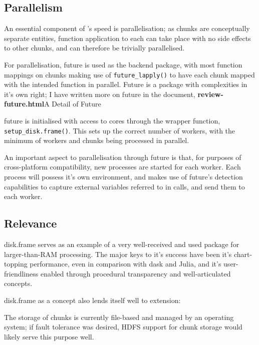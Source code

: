\hypertarget{sec:parallelisation}{
    \subsection{Parallelism}\label{sec:parallelisation}}

An essential component of 's speed is parallelisation; as
chunks are conceptually separate entities, function application to each
can take place with no side effects to other chunks, and can therefore
be trivially parallelised.

For parallelisation, future is used as the backend package, with most
function mappings on chunks making use of \texttt{future_lapply()}
to have each chunk mapped with the intended function in parallel. Future
is a package with complexities in it's own right; I have written more on
future in the document, \textbf{review-future.html}{A Detail of Future}

future is initialised with access to cores through the wrapper function,
\texttt{setup_disk.frame()}\cite{zj19:_key}.
This sets up the correct number of workers, with the minimum of workers
and chunks being processed in parallel.

An important aspect to parallelisation through future is that, for
purposes of cross-platform compatibility, new \R processes are started
for each worker\cite{zj19:_using}. Each process will possess it's own
environment, and  makes use of future's detection capabilities
to capture external variables referred to in calls, and send them to
each worker.

\hypertarget{sec:relevance}{%
    \subsection{Relevance}\label{sec:relevance}}

disk.frame serves as an example of a very well-received and used package
for larger-than-RAM processing. The major keys to it's success have been
it's chart-topping performance, even in comparison with dask and Julia,
and it's user-friendliness enabled through procedural transparency and
well-articulated concepts.

disk.frame as a concept also lends itself well to extension:

The storage of chunks is currently file-based and managed by an
operating system; if fault tolerance was desired, HDFS support for chunk
storage would likely serve this purpose well.


